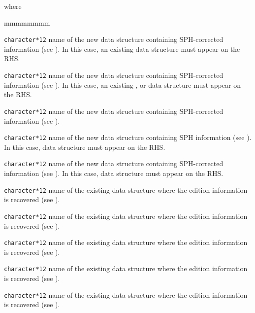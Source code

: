 \noindent
where
\begin{ListeDeDescription}{mmmmmmmm}

\item[\dusa{EDINEW}] {\tt character*12} name of the new  data
structure containing SPH-corrected information (see ). In this
case, an existing  data structure must appear on the RHS.

\item[\dusa{LIBNEW}] {\tt character*12} name of the new  data
structure containing SPH-corrected information (see ). In this
case, an existing ,  or  data structure
must appear on the RHS.

\item[\dusa{MACNEW}] {\tt character*12} name of the new  data
structure containing SPH-corrected information (see ).

\item[\dusa{SAPNEW}] {\tt character*12} name of the new  data
structure containing SPH information (see ). In this
case, data structure  must appear on the RHS.

\item[\dusa{CPONEW}] {\tt character*12} name of the new  data
structure containing SPH-corrected information (see ). In this
case, data structure  must appear on the RHS.

\item[\dusa{EDINAM}] {\tt character*12} name of the existing  data
structure where the edition information is recovered (see ).

\item[\dusa{LIBNAM}] {\tt character*12} name of the existing  data
structure where the edition information is recovered (see ).

\item[\dusa{MACNAM}] {\tt character*12} name of the existing  data
structure where the edition information is recovered (see ).

\item[\dusa{SAPNAM}] {\tt character*12} name of the existing  data
structure where the edition information is recovered (see ).

\item[\dusa{CPONAM}] {\tt character*12} name of the existing  data
structure where the edition information is recovered (see ).


\end{ListeDeDescription}
